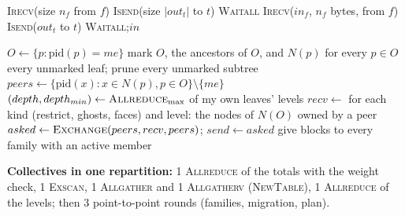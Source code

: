\begin{algorithm}[H]
  \caption{\textsc{Exchange}$(to, out, from)$ (): point
    to point, both sides name each other}
  \label{alg:exch}
  \begin{algorithmic}[1]
     \State \textsc{Irecv}(size $n_f$ from $f$) \EndFor
     \State \textsc{Isend}(size $|out_t|$ to $t$)
       \EndFor
    \State \textsc{Waitall}
     \State \textsc{Irecv}($in_f$, $n_f$
      bytes, from $f$) \EndFor
     \State \textsc{Isend}($out_t$ to
      $t$) \EndFor
    \State \textsc{Waitall};\quad \Return $in$
  \end{algorithmic}
\end{algorithm}

\begin{algorithm}[H]
  \caption{\textsc{SkeletonAndPlan}() (): what a
    rank keeps and exchanges}
  \label{alg:skeleton}
  \begin{algorithmic}[1]
    \State $O \gets \{p : \mathrm{pid}(p) = me\}$
    \State mark $O$, the ancestors of $O$, and $N(p)$ for every $p \in O$
    \State {} every unmarked leaf;\; prune every unmarked
      subtree
    \State $peers \gets \{\mathrm{pid}(x) : x \in N(p), p \in O\} \setminus
      \{me\}$ 
    \State $(depth, depth_{min}) \gets \textsc{Allreduce}_{\max}$ of my own
      leaves' levels
    \State $recv \gets$ for each kind (restrict, ghosts, faces) and level:
      the nodes of $N(O)$ owned by a peer 
    \State $asked \gets \textsc{Exchange}(peers, recv, peers)$;\quad
      $send \gets asked$ 
    \State give blocks to every family with an active member
  \end{algorithmic}
\end{algorithm}

\textbf{Collectives in one repartition:} 1 \textsc{Allreduce} of the
totals with the weight check, 1 \textsc{Exscan}, 1 \textsc{Allgather} and
1 \textsc{Allgatherv} (\textsc{NewTable}), 1 \textsc{Allreduce} of the
levels; then 3 point-to-point rounds (families, migration, plan).

